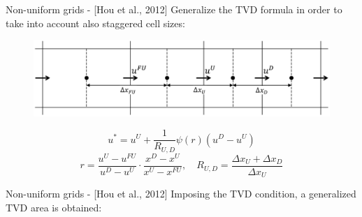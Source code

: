 \documentclass{beamer}
\begin{document}
\begin{frame}{Non-uniform grids - [Hou et al., 2012]}
Generalize the TVD formula in order to take into account also staggered cell 
sizes:
\begin{figure}
	\centering
	\includegraphics[width=\textwidth]{cells_with_sizes.pdf}
\end{figure}
\begin{equation*}
	u^* = u^U + \frac{1}{R_{U,D}} \psi(r)(u^D-u^U)
\end{equation*}
\begin{equation*}
		r = \frac{u^U-u^{FU}}{u^D-u^U}\cdot\frac{x^D-x^U}{x^U-x^{FU}}, \quad 
		R_{U,D} 
		= \frac{\Delta x_U + \Delta x_D}{\Delta x_U}
\end{equation*}
\end{frame}
\begin{frame}{Non-uniform grids - [Hou et al., 2012]}
Imposing the TVD condition, a generalized TVD area is obtained:
\vspace{-0.3cm}
\begin{figure}
	\centering
	\hspace{-1.cm}
	
\end{figure}
\end{frame}
\end{document}
